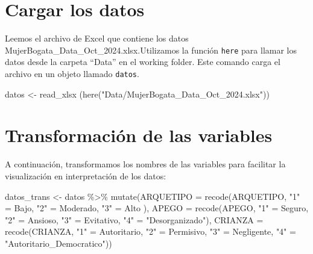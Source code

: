 \documentclass[
  letterpaper,
  DIV=11,
  numbers=noendperiod]{scrartcl}
\newenvironment{Shaded}{\begin{snugshade}}{\end{snugshade}}
\newcommand{\AttributeTok}[1]{\textcolor[rgb]{0.40,0.45,0.13}{#1}}
\newcommand{\FunctionTok}[1]{\textcolor[rgb]{0.28,0.35,0.67}{#1}}
\newcommand{\NormalTok}[1]{\textcolor[rgb]{0.00,0.23,0.31}{#1}}
\newcommand{\OtherTok}[1]{\textcolor[rgb]{0.00,0.23,0.31}{#1}}
\newcommand{\SpecialCharTok}[1]{\textcolor[rgb]{0.37,0.37,0.37}{#1}}
\newcommand{\StringTok}[1]{\textcolor[rgb]{0.13,0.47,0.30}{#1}}
\begin{document}
\section{Cargar los datos}\label{cargar-los-datos}

Leemos el archivo de Excel que contiene los datos
MujerBogata\_Data\_Oct\_2024.xlsx.Utilizamos la función \texttt{here}
para llamar los datos desde la carpeta ``Data'' en el working folder.
Este comando carga el archivo en un objeto llamado \texttt{datos}.

\begin{Shaded}
\begin{Highlighting}[]
\NormalTok{datos }\OtherTok{\textless{}{-}} \FunctionTok{read\_xlsx}\NormalTok{ (}\FunctionTok{here}\NormalTok{(}\StringTok{"Data/MujerBogata\_Data\_Oct\_2024.xlsx"}\NormalTok{))}
\end{Highlighting}
\end{Shaded}

\section{Transformación de las
variables}\label{transformaciuxf3n-de-las-variables}

A continuación, transformamos los nombres de las variables para
facilitar la visualización en interpretación de los datos:

\begin{Shaded}
\begin{Highlighting}[]
\NormalTok{datos\_trans }\OtherTok{\textless{}{-}}\NormalTok{ datos }\SpecialCharTok{\%\textgreater{}\%}
    \FunctionTok{mutate}\NormalTok{(}\AttributeTok{ARQUETIPO =} \FunctionTok{recode}\NormalTok{(ARQUETIPO, }\StringTok{"1"} \OtherTok{=} \StringTok{\textquotesingle{}Bajo\textquotesingle{}}\NormalTok{, }\StringTok{"2"} \OtherTok{=} \StringTok{\textquotesingle{}Moderado\textquotesingle{}}\NormalTok{, }\StringTok{"3"} \OtherTok{=}  \StringTok{\textquotesingle{}Alto\textquotesingle{}}\NormalTok{ ),}
           \AttributeTok{APEGO =} \FunctionTok{recode}\NormalTok{(APEGO, }\StringTok{"1"} \OtherTok{=} \StringTok{\textquotesingle{}Seguro\textquotesingle{}}\NormalTok{, }\StringTok{"2"} \OtherTok{=} \StringTok{\textquotesingle{}Ansioso\textquotesingle{}}\NormalTok{, }\StringTok{"3"} \OtherTok{=}  \StringTok{\textquotesingle{}Evitativo\textquotesingle{}}\NormalTok{, }\StringTok{"4"} \OtherTok{=} \StringTok{"Desorganizado"}\NormalTok{),}
           \AttributeTok{CRIANZA =} \FunctionTok{recode}\NormalTok{(CRIANZA, }\StringTok{"1"} \OtherTok{=} \StringTok{\textquotesingle{}Autoritario\textquotesingle{}}\NormalTok{, }\StringTok{"2"} \OtherTok{=} \StringTok{\textquotesingle{}Permisivo\textquotesingle{}}\NormalTok{, }\StringTok{"3"} \OtherTok{=}  \StringTok{\textquotesingle{}Negligente\textquotesingle{}}\NormalTok{, }\StringTok{"4"} \OtherTok{=} \StringTok{"Autoritario\_Democratico"}\NormalTok{))}
\end{Highlighting}
\end{Shaded}
\end{document}

